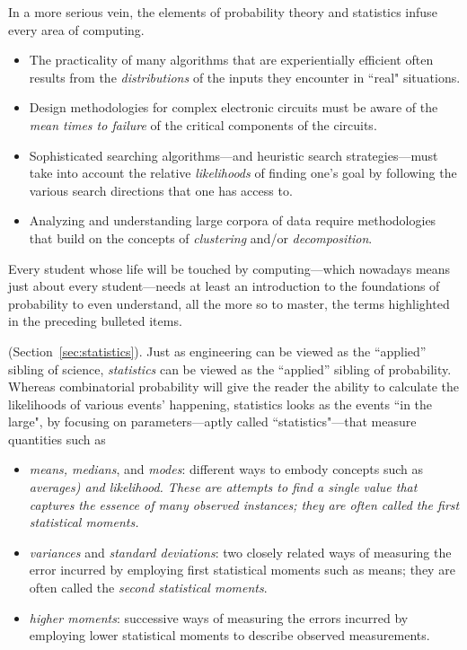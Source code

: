 In a more serious vein, the elements of probability theory and statistics infuse every area of
computing.
\begin{itemize}
\item
The practicality of many algorithms that are experientially efficient often results from the {\em distributions} of 
the inputs they encounter in ``real" situations.
\item
Design methodologies for complex electronic circuits must be aware of the {\em
  mean times to failure} of the critical components of the circuits.
\item
Sophisticated searching algorithms---and heuristic search strategies---must take into account the relative
{\em likelihoods} of finding one's goal by following the various search directions that one has access to.
\item
Analyzing and understanding large corpora of data require methodologies that build on the 
concepts of {\em clustering} and/or {\em decomposition}.
\end{itemize}
Every student whose life will be touched by computing---which nowadays means just about
every student---needs at least an introduction to the foundations of
probability to even understand, all the more so to master, the terms highlighted in the preceding bulleted items.

\medskip

 (Section~\ref{sec:statistics}).
Just as engineering can be viewed as the ``applied'' sibling of science, {\it statistics} can be viewed as 
the ``applied'' sibling of probability.  Whereas combinatorial probability will give the reader the ability to
calculate the likelihoods of various events' happening, statistics looks as the events ``in the large", by focusing on
parameters---aptly called ``statistics"---that measure quantities such as
\begin{itemize}
\item
{\em means, medians}, and {\em modes}: different ways to embody concepts 
such as {\em averages) and {\em likelihood}.  These are attempts to find a single value that captures the essence
of many observed instances; they are often called the {\it first statistical moments}.
}
\item
{\em variances} and {\em standard deviations}: two closely related ways of measuring the error incurred by
employing first statistical moments such as means; they are often called the {\it second statistical moments}.
\item
{\em higher moments}: successive ways of measuring the errors incurred by
employing lower statistical moments to describe observed measurements.
\end{itemize}




